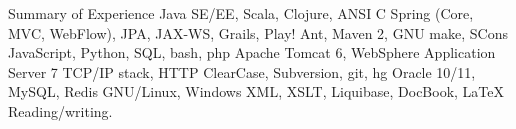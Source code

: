 \begin{rubric}{Summary of Experience}
   Java SE/EE, Scala, Clojure, ANSI C
  \entry*[Frameworks] Spring (Core, MVC, WebFlow), JPA, JAX-WS, Grails, Play!
   Ant, Maven 2, GNU make, SCons
  \entry*[Scripting] JavaScript, Python, SQL, bash, php
  \entry*[Servers] Apache Tomcat 6, WebSphere Application Server 7
  \entry*[Protocols] TCP/IP stack, HTTP
  \entry*[VCS] ClearCase, Subversion, git, hg
  \entry*[DataBases] Oracle 10/11, MySQL, Redis
  \entry*[OS] GNU/Linux, Windows
  \entry*[Other] XML, XSLT, Liquibase, DocBook, \LaTeX
  \entry*[English] Reading/writing.
\end{rubric}
